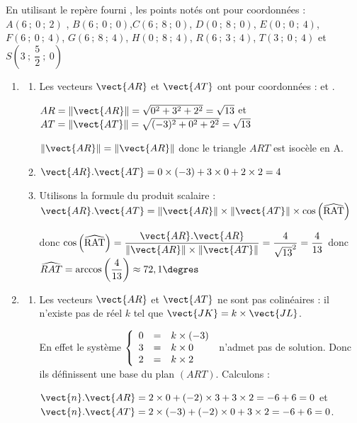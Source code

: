 
\medskip
En utilisant le repère fourni \Oijk, les points notés ont pour coordonnées : 
$A\left(6~;~0~;~2\right)$ , $B\left(6~;~0~;~0\right)$,$C\left(6~;~8~;~0\right)$, $D\left(0~;~8~;~0\right)$, $E\left(0~;~0~;~4\right)$, $F\left(6~;~0~;~4\right)$, $G\left(6~;~8~;~4\right)$, $H\left(0~;~8~;~4\right)$, $R\left(6~;~3~;~4\right)$, $T\left(3~;~0~;~4\right)$ et $S\left(3~;~\dfrac52~;~0\right)$

\begin{enumerate}
	\item 
	\begin{enumerate}
		\item Les vecteurs $\vect{AR}$ et $\vect{AT}$ ont pour coordonnées :  et .
		
		$AR=\lVert\vect{AR}\rVert=\sqrt{0^2+3^2+2^2}=\sqrt{13}$ et $AT=\lVert\vect{AT}\rVert=\sqrt{(-3)^2+0^2+2^2}=\sqrt{13}$
			
		$\lVert\vect{AR}\rVert=\lVert\vect{AR}\rVert$ donc le triangle $ART$ est isocèle en A.
		\item $\vect{AR}.\vect{AT}=0\times(-3)+3\times 0+2\times 2 = 4$
		\item Utilisons la formule du produit scalaire : $\vect{AR}.\vect{AT}= \left\|\vect{AR}\right\| \times \left\|\vect{AT}\right\| \times \cos \left(\widehat{\text{RAT}}\right)$ 
		
donc
		$\cos \left(\widehat{\text{RAT}}\right) = \dfrac{\vect{AR}.\vect{AR}}{\lVert\vect{AR}\rVert \times \lVert\vect{AT}\rVert}=\dfrac{4}{\sqrt{13}^2}=\dfrac{4}{13}$ donc $\widehat{RAT}=\arccos\left(\dfrac{4}{13}\right)\approx 72,1 \degres$
	\end{enumerate}
\item 
	\begin{enumerate}
		\item Les vecteurs $\vect{AR}$ et $\vect{AT}$ ne sont pas colinéaires : il n'existe pas de réel $k$ tel que $\vect{JK}=k\times \vect{JL}$.
		
		En effet le système $\left\{\begin{array}{l c l} 0&=&k\times (-3)\\3 &=& k\times 0\\2&=& k\times 2 \end{array}\right.$ n'admet pas de solution.
		Donc ils définissent une base du plan $(ART)$.
		Calculons :
		
		$\vect{n}.\vect{AR}=2\times 0+(-2)\times 3+3\times 2=-6+6=0$ et $\vect{n}.\vect{AT}=2\times(-3)+(-2)\times 0+3\times 2=-6+6=0$.
		

\end{enumerate}
\end{enumerate}
